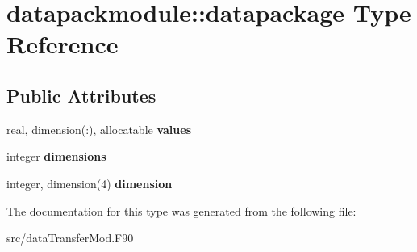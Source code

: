 \hypertarget{structdatapackmodule_1_1datapackage}{}\section{datapackmodule\+:\+:datapackage Type Reference}
\label{structdatapackmodule_1_1datapackage}
\subsection*{Public Attributes}
\begin{DoxyCompactItemize}
\item 
\hypertarget{structdatapackmodule_1_1datapackage_ae331fa6a0fa5448c2946aca0367550a1}{}real, dimension(\+:), allocatable {\bfseries values}\label{structdatapackmodule_1_1datapackage_ae331fa6a0fa5448c2946aca0367550a1}

\item 
\hypertarget{structdatapackmodule_1_1datapackage_ae9fb1b032b1a001bdfe0dbcffe127200}{}integer {\bfseries dimensions}\label{structdatapackmodule_1_1datapackage_ae9fb1b032b1a001bdfe0dbcffe127200}

\item 
\hypertarget{structdatapackmodule_1_1datapackage_a859b79a8b3ac63c5a6a6ef9c9d5cf84c}{}integer, dimension(4) {\bfseries dimension}\label{structdatapackmodule_1_1datapackage_a859b79a8b3ac63c5a6a6ef9c9d5cf84c}

\end{DoxyCompactItemize}


The documentation for this type was generated from the following file\+:\begin{DoxyCompactItemize}
\item 
src/data\+Transfer\+Mod.\+F90\end{DoxyCompactItemize}
